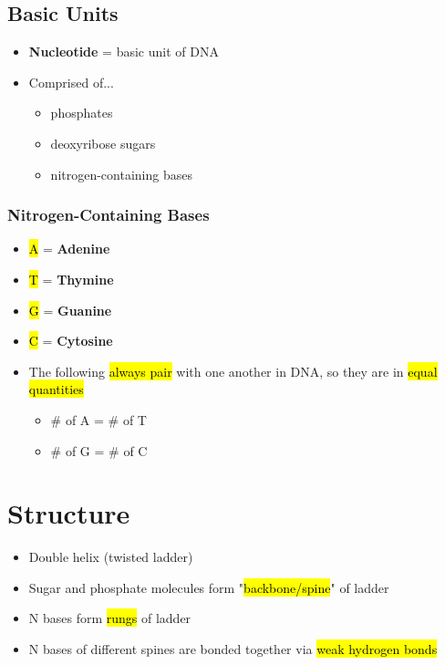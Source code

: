 \documentclass[a4paper,12pt]{article}
\begin{document}
\subsection{Basic Units}
\begin{itemize}
    \item{\textbf{Nucleotide} = basic unit of DNA}
    \item{
            Comprised of...
            \begin{itemize}
                \item{phosphates}
                \item{deoxyribose sugars}
                \item{nitrogen-containing bases}
            \end{itemize}
        }
\end{itemize}

\subsubsection{Nitrogen-Containing Bases}
\begin{itemize}
    \item{\hl{A} = \textbf{Adenine}}
    \item{\hl{T} = \textbf{Thymine}}
    \item{\hl{G} = \textbf{Guanine}}
    \item{\hl{C} = \textbf{Cytosine}}
        \\
    \item{
            The following \hl{always pair} with one another in DNA, so they are in \hl{equal quantities}
            \begin{itemize}
                \item{\# of A = \# of T}
                \item{\# of G = \# of C}
            \end{itemize}
        }
\end{itemize}

\section{Structure}
\begin{itemize}
    \item{Double helix (twisted ladder)}
    \item{Sugar and phosphate molecules form "\hl{backbone/spine}" of ladder}
    \item{N bases form \hl{rungs} of ladder}
    \item{N bases of different spines are bonded together via \hl{weak hydrogen bonds}}
\end{itemize}
\end{document}
